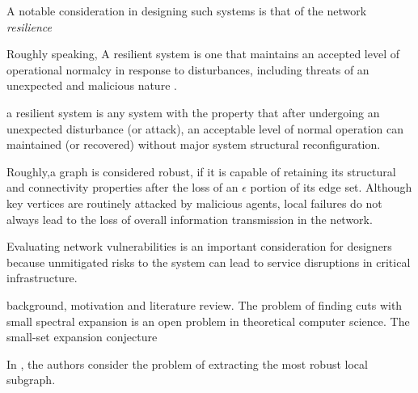 \documentclass{amsart}
\theoremstyle{definition}
\theoremstyle{remark}
\numberwithin{equation}{section}
\begin{document}
\medskip

A notable consideration in designing such systems is that of the network \textit{resilience}\cite{Akoglu2015,Dinh2015,Grubesic2008,Murray2008,Banerjee2009,Banerjee2011,Pinar2010,Albert2004,Basar2012,Dinh2012,Agarwal2013,Dinh2010,Thai2015,Shen2012,Rieg2009,Bai2012,Rieg2012,Basar2011,Kis2013,Dong2014,Basar2012,Basar2013,Geh2013,Dong2013,Lamport1982,Meng2014,Garcia2014,Cheng2015,Pas2015,Pas2013,Pas2012,PasPhd2012,Pas2010,Pas2007,Kha2014,Gupta2010,Fawzi2014,Wente2014,Sund2013,Teix2014}

Roughly speaking, A resilient system is one that maintains an accepted level of operational normalcy in response to disturbances, including threats of an unexpected and malicious nature \cite{Rieg2009}. 

a resilient system is any system with the property that after undergoing an unexpected disturbance (or attack), an acceptable level of normal operation can maintained (or recovered) without major system structural reconfiguration.  

Roughly,a graph is considered robust, if it is capable of retaining its structural and connectivity properties after the loss of an $\epsilon$ portion of its edge set.  Although key vertices are routinely attacked by malicious agents, local failures  do not always  lead  to  the  loss  of  overall information transmission in the network. 

\medskip

Evaluating network vulnerabilities is an important consideration for designers because unmitigated risks to the system can lead to service disruptions in critical infrastructure. 

background, motivation and literature review.
The problem of finding cuts with small spectral expansion is an open problem in theoretical computer science. The small-set expansion conjecture 

\medskip

In \cite{Akoglu2015}, the authors consider the problem of extracting the most robust local subgraph. 

\medskip
\end{document}
